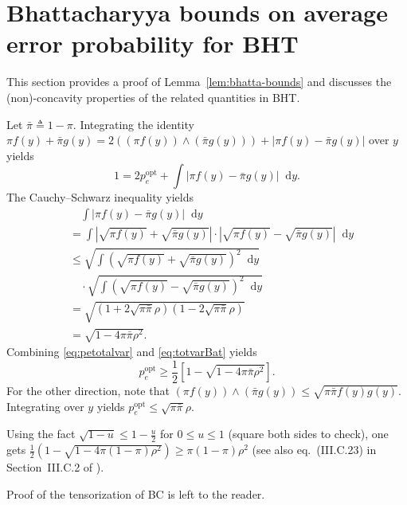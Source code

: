 \documentclass[conference,letterpaper]{IEEEtran}
\newcommand{\defeq}{\triangleq}
\renewcommand{\d}{\mathop{}\!\mathrm{d}}%
\newcommand{\distA}{f}%
\newcommand{\distB}{g}%
\newcommand{\errorOpt}{p_e^{\mathrm{opt}}}
\newcommand{\piComp}{\bar\pi}
\begin{document}
{\section{Bhattacharyya bounds on average error probability for BHT}
\label{app:bhatta-bounds}
This section provides a proof of Lemma~\ref{lem:bhatta-bounds} and
discusses the (non)-concavity properties of the related quantities in
BHT.
\begin{IEEEproof}
  Let $\piComp \defeq 1 - \pi$.  Integrating the identity
  $\pi \distA(y) + \piComp\distB(y) = 2((\pi \distA(y)) \wedge
  (\piComp \distB(y))) + |\pi \distA(y) - \piComp\distB(y)|$ over $y$
  yields
  \begin{equation}
    \label{eq:petotalvar}
    1 = 2\errorOpt  + \int|\pi \distA(y) - \piComp\distB(y)|\d y.
  \end{equation}
  The Cauchy–Schwarz inequality yields
  \begin{align}
    &\quad\int|\pi \distA(y) - \piComp\distB(y)|\d y\nonumber\\
    & = \int\left|\sqrt{\pi \distA(y)} +
      \sqrt{\piComp\distB(y)}\right|\cdot\left|\sqrt{\pi \distA(y)} -
      \sqrt{\piComp\distB(y)}\right|\d y\nonumber\\
    & \le \sqrt{\int\left(\sqrt{\pi \distA(y)} +
      \sqrt{\piComp\distB(y)}\right)^2 \d y}\nonumber\\
    &\quad\cdot \sqrt{\int \left(\sqrt{\pi \distA(y)} -
      \sqrt{\piComp\distB(y)}\right)^2\d y} \nonumber \\
    & = \sqrt{(1 + 2\sqrt{\pi\piComp}\rho)(1 - 2\sqrt{\pi\piComp}\rho)}\nonumber\\
    & = \sqrt{1 - 4\pi\piComp\rho^2}.   \label{eq:totvarBat}
  \end{align}
  Combining \eqref{eq:petotalvar} and \eqref{eq:totvarBat} yields
  \[\errorOpt  \geq \frac 1 2 \left[ 1 - \sqrt{1 - 4\pi\piComp\rho^2 } \right].\]
  For the other direction, note that
  $(\pi \distA(y)) \wedge (\piComp\distB(y)) \le
  \sqrt{\pi\piComp\distA(y)\distB(y)}$.  Integrating over $y$ yields
  $\errorOpt \le \sqrt{\pi\piComp}\rho$.

  Using the fact $\sqrt{1-u}\le 1 -\frac u 2$ for $0 \leq u \leq 1$
  (square both sides to check), one gets
  $\frac 12(1 - \sqrt{1 - 4\pi(1 - \pi)\rho^2}) \ge \pi(1 -
  \pi)\rho^2$ (see also eq.~(III.C.23) in Section~III.C.2 of
  \cite{Poor94}).

  Proof of the tensorization of BC is left to the reader.
\end{IEEEproof}

}
\end{document}
